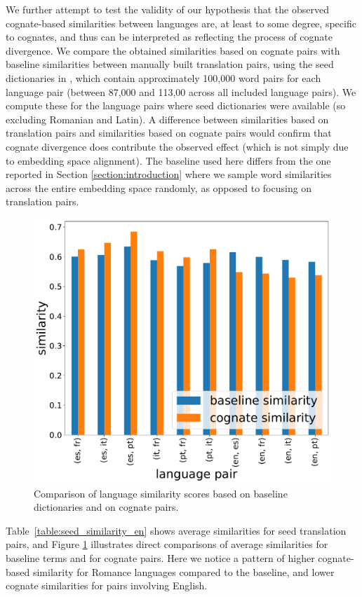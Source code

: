 \documentclass[output=paper]{langsci/langscibook}
\begin{document}
We further attempt to test the validity of our hypothesis that the observed cognate-based similarities between languages are, at least to some degree, specific to cognates, and thus can be interpreted as reflecting the process of cognate divergence. We compare the obtained similarities based on cognate pairs with baseline similarities between manually built translation pairs, using the seed dictionaries in \citet{cognatesuban:conneau2017word}, which contain approximately 100,000 word pairs for each language pair (between 87,000 and 113,00 across all included language pairs). We compute these for the language pairs where seed dictionaries were available (so excluding Romanian and Latin). A difference between similarities based on translation pairs and similarities based on cognate pairs would confirm that cognate divergence does contribute the observed effect (which is not simply due to embedding space alignment). The baseline used here differs from the one reported in Section \ref{section:introduction} where we sample word similarities across the entire embedding space randomly, as opposed to focusing on translation pairs.

\begin{figure}
    \centering
    \includegraphics[width=0.5\linewidth]{figures/UBAN_baseline_vs_cognates_similarities_bar.pdf}
    \caption{Comparison of language similarity scores based on baseline dictionaries and on cognate pairs.}
    \label{fig:baseline_vs_cognates}
\end{figure}

Table~\ref{table:seed_similarity_en} shows average similarities for seed translation pairs, and Figure \ref{fig:baseline_vs_cognates} illustrates direct comparisons of average similarities for baseline terms and for cognate pairs. Here we notice a pattern of higher cognate-based similarity for Romance languages compared to the baseline, and lower cognate similarities for pairs involving English.
\end{document}
